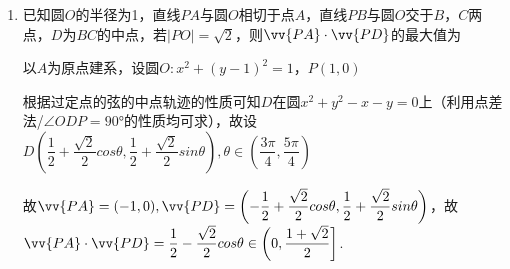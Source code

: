 \begin{enumerate}
    \item 已知圆$O$的半径为1，直线$PA$与圆$O$相切于点$A$，直线$PB$与圆$O$交于$B$，$C$两点，$D$为$BC$的中点，若$|PO| = \sqrt{2}$，则$\vv{PA} \cdot \vv{PD}$的最大值为
    \begin{jieda}
        以$A$为原点建系，设圆$O:x^2+(y-1)^2 = 1$，$P(1, 0)$

        根据过定点的弦的中点轨迹的性质可知$D$在圆$x^2 + y^2 - x - y = 0$上（利用点差法/$\angle ODP = \ang{90}$的性质均可求），故设$D\left(\dfrac{1}{2}+\dfrac{\sqrt{2}}{2}cos\theta, \dfrac{1}{2}+\dfrac{\sqrt{2}}{2}sin\theta\right), \theta \in \left(\dfrac{3\pi}{4}, \dfrac{5\pi}{4}\right)$
        
        故$\vv{PA} = (-1, 0), \vv{PD} = \left(-\dfrac{1}{2}+\dfrac{\sqrt{2}}{2}cos\theta, \dfrac{1}{2}+\dfrac{\sqrt{2}}{2}sin\theta\right)$，故$\vv{PA}  \cdot \vv{PD} = \dfrac{1}{2}-\dfrac{\sqrt{2}}{2}cos\theta \in \left(0, \dfrac{1+\sqrt{2}}{2}\right]$.
    \end{jieda}
\end{enumerate}
